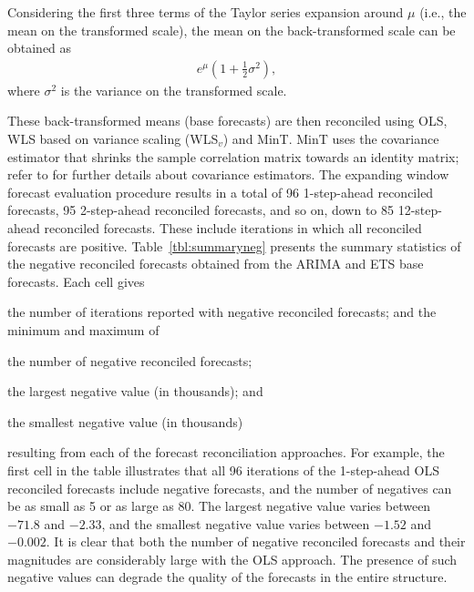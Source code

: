 \documentclass[11pt]{article}
\newcommand{\0}{\phantom{0}}
\begin{document}
Considering the first three terms of the Taylor series expansion around $\mu$ (i.e., the mean on the transformed scale), the mean on the back-transformed scale can be obtained as
\begin{align*}
e^{\mu}\left(1 + \frac{1}{2}\sigma^{2}\right),
\end{align*}
where $\sigma^{2}$ is the variance on the transformed scale.

These back-transformed means (base forecasts) are then reconciled using OLS, WLS based on variance scaling (WLS$_{v}$) and MinT. MinT uses the covariance estimator that shrinks the sample correlation matrix towards an identity matrix; refer to \citet{Wick2018} for further details about covariance estimators. The expanding window forecast evaluation procedure results in a total of 96 1-step-ahead reconciled forecasts, 95 2-step-ahead reconciled forecasts, and so on, down to 85 12-step-ahead reconciled forecasts. These include iterations in which all reconciled forecasts are positive. Table~\ref{tbl:summaryneg} presents the summary statistics of the negative reconciled forecasts obtained from the ARIMA and ETS base forecasts. Each cell gives \begin{inparaenum}[(i)] \item the number of iterations reported with negative reconciled forecasts; and the minimum and maximum of \item the number of negative reconciled forecasts; \item the largest negative value (in thousands); and \item the smallest negative value (in thousands) \end{inparaenum} resulting from each of the forecast reconciliation approaches. For example, the first cell in the table illustrates that all 96 iterations of the 1-step-ahead OLS reconciled forecasts include negative forecasts, and the number of negatives can be as small as 5 or as large as 80. The largest negative value varies between $-71.8$ and $-2.33$, and the smallest negative value varies between $-1.52$ and $-0.002$. It is clear that both the number of negative reconciled forecasts and their magnitudes are considerably large with the OLS approach. The presence of such negative values can degrade the quality of the forecasts in the entire structure.
\end{document}
